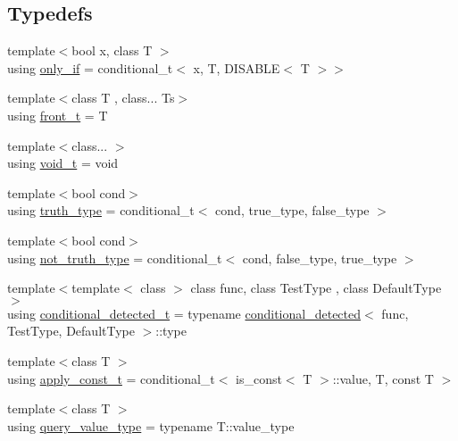 \subsection*{Typedefs}
\begin{DoxyCompactItemize}
\item 
{\footnotesize template$<$bool x, class T $>$ }\\using \hyperlink{namespaceBC_1_1meta_afed7f4daa1d160f98e989138722fd031}{only\+\_\+if} = conditional\+\_\+t$<$ x, T, D\+I\+S\+A\+B\+LE$<$ T $>$$>$
\item 
{\footnotesize template$<$class T , class... Ts$>$ }\\using \hyperlink{namespaceBC_1_1meta_a056dc88b198c2be612e8cc5e71d5a80a}{front\+\_\+t} = T
\item 
{\footnotesize template$<$class... $>$ }\\using \hyperlink{namespaceBC_1_1meta_a6d85000fa23ed054d13d342b50b2cf7b}{void\+\_\+t} = void
\item 
{\footnotesize template$<$bool cond$>$ }\\using \hyperlink{namespaceBC_1_1meta_a36c1180b5ffcc8f159fda0a2c3ff9e73}{truth\+\_\+type} = conditional\+\_\+t$<$ cond, true\+\_\+type, false\+\_\+type $>$
\item 
{\footnotesize template$<$bool cond$>$ }\\using \hyperlink{namespaceBC_1_1meta_aa86d8674ffa01ce4fdb9c908830b2279}{not\+\_\+truth\+\_\+type} = conditional\+\_\+t$<$ cond, false\+\_\+type, true\+\_\+type $>$
\item 
{\footnotesize template$<$template$<$ class $>$ class func, class Test\+Type , class Default\+Type $>$ }\\using \hyperlink{namespaceBC_1_1meta_a96ed28f49a8ffe8f0bae28da99e6ee18}{conditional\+\_\+detected\+\_\+t} = typename \hyperlink{structBC_1_1meta_1_1conditional__detected}{conditional\+\_\+detected}$<$ func, Test\+Type, Default\+Type $>$\+::type
\item 
{\footnotesize template$<$class T $>$ }\\using \hyperlink{namespaceBC_1_1meta_a210dff319dbb0dd2a60fcfdda5779ace}{apply\+\_\+const\+\_\+t} = conditional\+\_\+t$<$ is\+\_\+const$<$ T $>$\+::value, T, const T $>$
\item 
{\footnotesize template$<$class T $>$ }\\using \hyperlink{namespaceBC_1_1meta_a36503419befa65fc6e75a98b507337d7}{query\+\_\+value\+\_\+type} = typename T\+::value\+\_\+type
\item 
$$
\end{DoxyCompactItemize}
